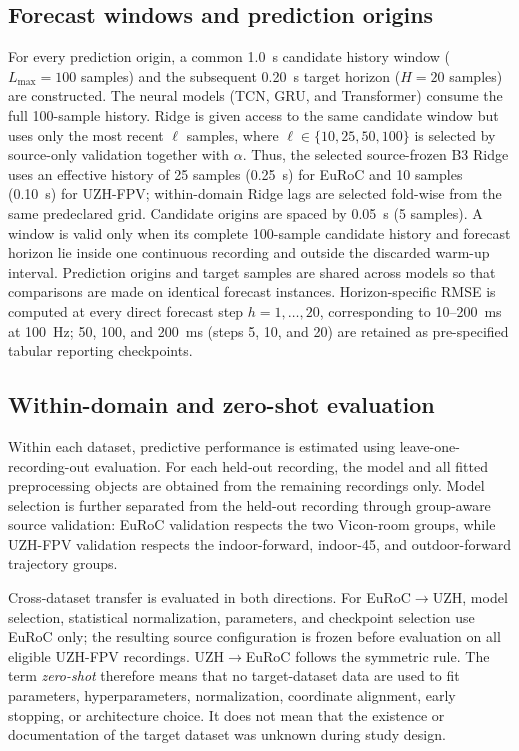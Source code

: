 \documentclass[preprint,12pt]{elsarticle}
\begin{document}
\subsection{Forecast windows and prediction origins}

For every prediction origin, a common \SI{1.0}{\second} candidate history window ($L_{\max}=100$ samples) and the subsequent \SI{0.20}{\second} target horizon ($H=20$ samples) are constructed. The neural models (TCN, GRU, and Transformer) consume the full 100-sample history. Ridge is given access to the same candidate window but uses only the most recent $\ell$ samples, where $\ell\in\{10,25,50,100\}$ is selected by source-only validation together with $\alpha$. Thus, the selected source-frozen B3 Ridge uses an effective history of 25 samples (\SI{0.25}{\second}) for EuRoC and 10 samples (\SI{0.10}{\second}) for UZH-FPV; within-domain Ridge lags are selected fold-wise from the same predeclared grid. Candidate origins are spaced by \SI{0.05}{\second} (5 samples). A window is valid only when its complete 100-sample candidate history and forecast horizon lie inside one continuous recording and outside the discarded warm-up interval. Prediction origins and target samples are shared across models so that comparisons are made on identical forecast instances. Horizon-specific RMSE is computed at every direct forecast step $h=1,\ldots,20$, corresponding to 10--\SI{200}{\milli\second} at 100~Hz; 50, 100, and \SI{200}{\milli\second} (steps 5, 10, and 20) are retained as pre-specified tabular reporting checkpoints.

\subsection{Within-domain and zero-shot evaluation}

Within each dataset, predictive performance is estimated using leave-one-recording-out evaluation. For each held-out recording, the model and all fitted preprocessing objects are obtained from the remaining recordings only. Model selection is further separated from the held-out recording through group-aware source validation: EuRoC validation respects the two Vicon-room groups, while UZH-FPV validation respects the indoor-forward, indoor-45, and outdoor-forward trajectory groups.

Cross-dataset transfer is evaluated in both directions. For EuRoC$\rightarrow$UZH, model selection, statistical normalization, parameters, and checkpoint selection use EuRoC only; the resulting source configuration is frozen before evaluation on all eligible UZH-FPV recordings. UZH$\rightarrow$EuRoC follows the symmetric rule. The term \emph{zero-shot} therefore means that no target-dataset data are used to fit parameters, hyperparameters, normalization, coordinate alignment, early stopping, or architecture choice. It does not mean that the existence or documentation of the target dataset was unknown during study design.
\end{document}
